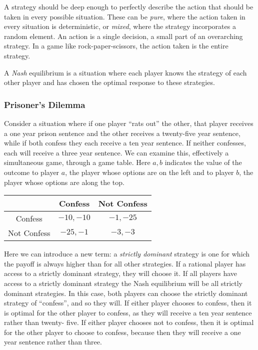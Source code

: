 \documentclass[12pt]{report}
\begin{document}
\begin{flushleft}
\bigskip
A strategy should be deep enough to perfectly describe the action that should
be taken in every possible situation. These can be \textit{pure}, where the
action taken in every situation is deterministic, or \textit{mixed}, where the
strategy incorporates a random element. An action is a single decision, a small
part of an overarching strategy. In a game like rock-paper-scissors, the action
taken is the entire strategy.

\bigskip
A \textit{Nash} equilibrium is a situation where each player knows the strategy
of each other player and has chosen the optimal response to these strategies.

\subsubsection*{Prisoner's Dilemma}
Consider a situation where if one player ``rats out'' the other, that player
receives a one year prison sentence and the other receives a twenty-five year
sentence, while if both confess they each receive a ten year sentence. If 
neither confesses, each will receive a three year sentence. We can examine 
this, effectively a simultaneous game, through a game table. Here 
\(a, b\) indicates the value of the outcome to player \(a\), the player whose
options are on the left and to player \(b\), the player whose options are along
the top.

\begin{center}
    \begin{tabular}{c|c|c}
        & Confess & Not Confess \\
        \hline
        Confess & \(-10, -10\) & \(-1, -25\)\\
        Not Confess & \(-25, -1\) & \(-3, -3\) \\ 
    \end{tabular}
\end{center}

Here we can introduce a new term: a \textit{strictly dominant} strategy is one
for which the payoff is always higher than for all other strategies. If a 
rational player has access to a strictly dominant strategy, they will choose 
it. If all players have access to a strictly dominant strategy the Nash 
equilibrium will be all strictly dominant strategies. In this case, both 
players can choose the strictly dominant strategy of ``confess'', and so they
will. If either player chooses to confess, then it is optimal for the other
player to confess, as they will receive a ten year sentence rather than twenty-
five. If either player chooses not to confess, then it is optimal for the other
player to choose to confess, because then they will receive a one year sentence
rather than three.


\end{flushleft}
\end{document}
